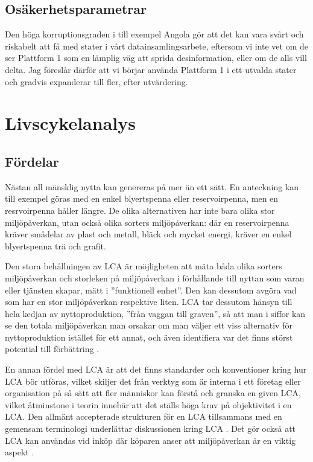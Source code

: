 \documentclass{article}
\begin{document}
\subsection{Osäkerhetsparametrar}

Den höga korruptionsgraden i till exempel Angola  gör att det kan vara svårt och riskabelt att få med stater i vårt datainsamlingsarbete, eftersom vi inte vet om de ser Plattform 1 som en lämplig väg att sprida desinformation, eller om de alls vill delta. Jag föreslår därför att vi börjar använda Plattform 1 i ett utvalda stater och gradvis expanderar till fler, efter utvärdering.





\clearpage
\section{Livscykelanalys}

\subsection{Fördelar}

Nästan all mänsklig nytta kan genereras på mer än ett sätt. En anteckning kan till exempel göras med en enkel blyertspenna eller reservoirpenna, men en resrvoirpenna håller längre. De olika alternativen har inte bara olika stor miljöpåverkan, utan också olika sorters miljöpåverkan: där en reservoirpenna kräver smådelar av plast och metall, bläck och mycket energi, kräver en enkel blyertspenna trä och grafit. 

Den stora behållningen av LCA är möjligheten att mäta båda olika sorters miljöpåverkan och storleken på miljöpåverkan i förhållande till nyttan som varan eller tjänsten skapar, mätt i ''funktionell enhet''. Den kan dessutom avgöra vad som har en stor miljöpåverkan respektive liten. LCA tar dessutom hänsyn till hela kedjan av nyttoproduktion, ''från vaggan till graven'', så att man i siffor kan se den totala miljöpåverkan man orsakar om man väljer ett viss alternativ för nyttoproduktion istället för ett annat, och även identifiera var det finns störst potential till förbättring  .

En annan fördel med LCA är att det finns standarder och konventioner kring hur LCA bör utföras, vilket skiljer det från verktyg som är interna i ett företag eller organisation på så sätt att fler människor kan förstå och granska en given LCA, vilket åtminstone i teorin innebär att det ställs höga krav på objektivitet i en LCA. Den allmänt accepterade strukturen för en LCA tillsammans med en gemensam terminologi underlättar diskussionen kring LCA . Det gör också att LCA kan användas vid inköp där köparen anser att miljöpåverkan är en viktig aspekt .
\end{document}
